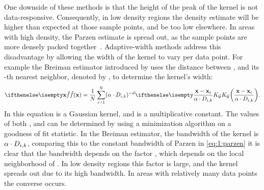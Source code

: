 	One downside of these methods is that the height of the peak of the kernel is not data-responsive. Consequently, in low density regions the density estimate will be higher than expected at those sample points, and be too low elsewhere. In areas with high density, the Parzen estimate is spread out, as the sample points are more densely packed together~\cite{breiman1977variable}. Adaptive-width methods address this disadvantage by allowing the width of the kernel to vary per data point. For example the Breiman estimator introduced by \textcite{breiman1977variable} uses the distance between \varPattern[\itXis], and its \KNNK-th nearest neighbor, denoted by \varKNNDistance{\itXis}{\KNNK}, to determine the kernel's width:
	\begin{equation}\label{eq:1:BML}
	 	\varEstimatedDensityFunction{\varPattern} = \frac{1}{\varNumPatterns} \sum_{\itXis = 1}^{\varNumPatterns} (\varBMLconstant \cdot \varKNNDistance{\itXis}{k})^{-\varDim} \varKernel[\varGaussian]{\frac{\varPattern - \varPattern[\itXis]}{\varBMLconstant \cdot \varKNNDistance{\itXis}{k}}}.
	\end{equation}
	In this equation \varKernel[\varGaussian]{} is a Gaussian kernel, and \varBMLconstant is a multiplicative constant. The values of both \varBMLconstant, and \KNNK can be determined by using a minimization algorithm on a goodness of fit statistic. In the Breiman estimator, the bandwidth of the kernel is $\alpha \cdot D_{i, k}$, comparing this to the constant bandwidth \varBandwidth of Parzen in \cref{eq:1:parzen} it is clear that the bandwidth depends on the factor \varKNNDistance{\itXis}{\KNNK}, which depends on the local neighborhood of \varPattern[\itXis]. In low density regions this factor is large, and the kernel spreads out due to its high bandwidth. In areas with relatively many data points the converse occurs.

